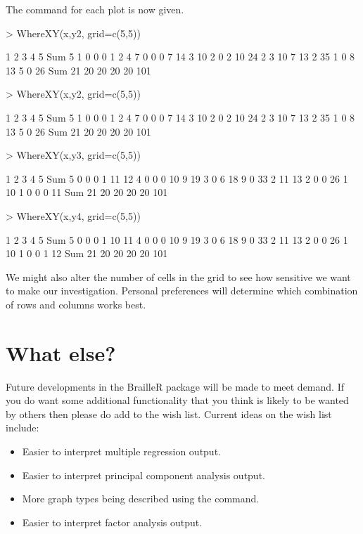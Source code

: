 The  command for each plot is now given. 
\begin{Schunk}
\begin{Sinput}
> WhereXY(x,y2, grid=c(5,5)) 
\end{Sinput}
\begin{Soutput}
     1  2  3  4  5 Sum
5    1  0  0  0  1   2
4    7  0  0  0  7  14
3   10  2  0  2 10  24
2    3 10  7 13  2  35
1    0  8 13  5  0  26
Sum 21 20 20 20 20 101
\end{Soutput}
\begin{Sinput}
> WhereXY(x,y2, grid=c(5,5)) 
\end{Sinput}
\begin{Soutput}
     1  2  3  4  5 Sum
5    1  0  0  0  1   2
4    7  0  0  0  7  14
3   10  2  0  2 10  24
2    3 10  7 13  2  35
1    0  8 13  5  0  26
Sum 21 20 20 20 20 101
\end{Soutput}
\begin{Sinput}
> WhereXY(x,y3, grid=c(5,5)) 
\end{Sinput}
\begin{Soutput}
     1  2  3  4  5 Sum
5    0  0  0  1 11  12
4    0  0  0 10  9  19
3    0  6 18  9  0  33
2   11 13  2  0  0  26
1   10  1  0  0  0  11
Sum 21 20 20 20 20 101
\end{Soutput}
\begin{Sinput}
> WhereXY(x,y4, grid=c(5,5)) 
\end{Sinput}
\begin{Soutput}
     1  2  3  4  5 Sum
5    0  0  0  1 10  11
4    0  0  0 10  9  19
3    0  6 18  9  0  33
2   11 13  2  0  0  26
1   10  1  0  0  1  12
Sum 21 20 20 20 20 101
\end{Soutput}
\end{Schunk}
 
We might also alter the number of cells in the grid to see how sensitive we want to make our investigation. Personal preferences will determine which combination of rows and columns works best. 
 
\section{What else?} 
 
Future developments in the BrailleR package will be made to meet demand. If you do want some additional functionality that you think is likely to be wanted by others then please do add to the wish list. Current ideas on the wish list include: 
\begin{itemize} 
\item Easier to interpret multiple regression output. 
\item Easier to interpret principal component analysis output. 
\item More graph types being described using the  command. 
\item Easier to interpret factor analysis output. 
\end{itemize} 
 
 
 

